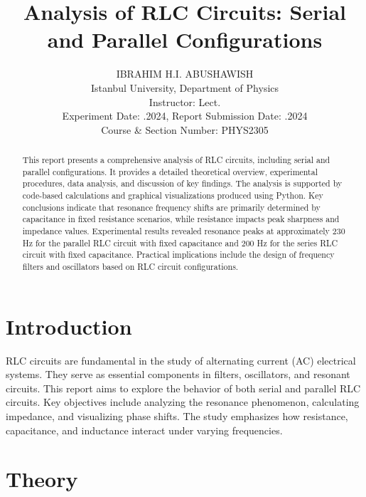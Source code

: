 \documentclass[journal]{IEEEtran}
\begin{document}
 
\title{Analysis of RLC Circuits: Serial and Parallel Configurations}
\author{IBRAHIM H.I. ABUSHAWISH \\
Istanbul University, Department of Physics \\
Instructor: Lect.  \\
Experiment Date: .2024, Report Submission Date: .2024\\
Course \& Section Number: PHYS2305}

\maketitle

\begin{abstract}
    This report presents a comprehensive analysis of RLC circuits, including serial and parallel configurations. It provides a detailed theoretical overview, experimental procedures, data analysis, and discussion of key findings. The analysis is supported by code-based calculations and graphical visualizations produced using Python. Key conclusions indicate that resonance frequency shifts are primarily determined by capacitance in fixed resistance scenarios, while resistance impacts peak sharpness and impedance values. Experimental results revealed resonance peaks at approximately 230 Hz for the parallel RLC circuit with fixed capacitance and 200 Hz for the series RLC circuit with fixed capacitance. Practical implications include the design of frequency filters and oscillators based on RLC circuit configurations.
\end{abstract}
    
\section{Introduction}
RLC circuits are fundamental in the study of alternating current (AC) electrical systems. They serve as essential components in filters, oscillators, and resonant circuits. This report aims to explore the behavior of both serial and parallel RLC circuits. Key objectives include analyzing the resonance phenomenon, calculating impedance, and visualizing phase shifts. The study emphasizes how resistance, capacitance, and inductance interact under varying frequencies.

\section{Theory}
\end{document}
